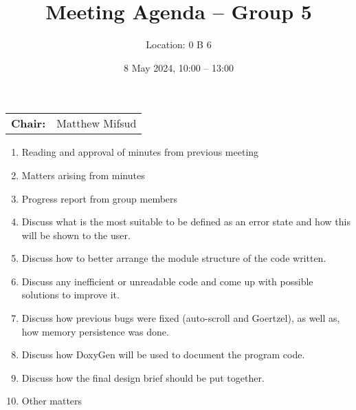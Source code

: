 \documentclass{cce2014-meetings}
\title{Meeting Agenda -- Group 5}
\author{Location: 0 B 6}
\date{8 May 2024, 10:00 -- 13:00}
\begin{document}
\maketitle
\begin{center}
\begin{tabular}{ll}
\textbf{Chair:}   & Matthew Mifsud \\
\end{tabular}
\end{center}

\begin{enumerate}

\item Reading and approval of minutes from previous meeting

\item Matters arising from minutes

\item Progress report from group members

\item Discuss what is the most suitable to be defined as an error state and how this will be shown to the user.

\item Discuss how to better arrange the module structure of the code written.

\item Discuss any inefficient or unreadable code and come up with possible solutions to improve it.

\item Discuss how previous bugs were fixed (auto-scroll and Goertzel), as well as, how memory persistence was done.

\item Discuss how DoxyGen will be used to document the program code.

\item Discuss how the final design brief should be put together.


\item Other matters

\end{enumerate}
\end{document}
